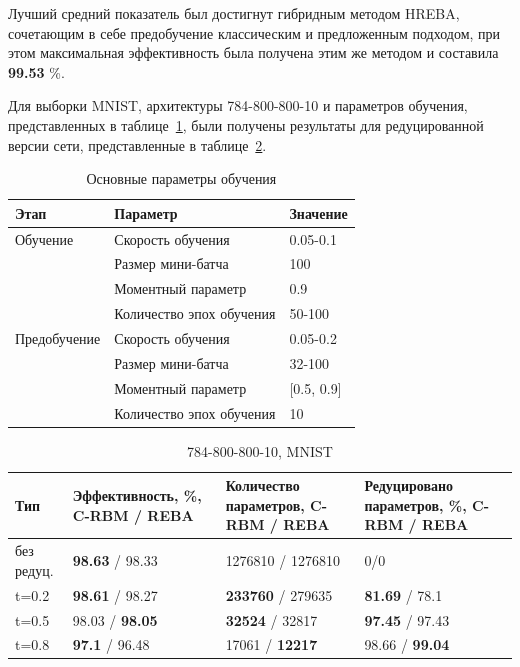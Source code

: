 \documentclass{thesisby}
\begin{document}
Лучший средний показатель был достигнут гибридным методом HREBA, сочетающим в себе предобучение классическим и предложенным подходом, при этом максимальная эффективность была получена этим же методом и составила \textbf{99.53} \%.

Для выборки MNIST, архитектуры 784-800-800-10 и параметров обучения, представленных в таблице~\ref{table:params_mnist_reduce}, были получены результаты для редуцированной версии сети, представленные в таблице~\ref{table:results_mnist_reduce}.

\begin{table} [h!]
  \small
  \caption{Основные параметры обучения}\label{table:params_mnist_reduce}
\centering
\begin{tabular}{| p{3cm} | p{6cm} | p{2cm} |}
  \hline
    \textbf{Этап} & \textbf{Параметр} & \textbf{Значение}\\
    \hline
    Обучение & Скорость обучения & 0.05-0.1\\
    \cline{2-3}
    & Размер мини-батча & 100 \\
    \cline{2-3}
    & Моментный параметр & 0.9 \\
    \cline{2-3}
    & Количество эпох обучения & 50-100\\
    \hline
    Предобучение & Скорость обучения & 0.05-0.2\\
    \cline{2-3}
    & Размер мини-батча & 32-100 \\
    \cline{2-3}
    & Моментный параметр & [0.5, 0.9] \\
    \cline{2-3}
    & Количество эпох обучения & 10\\
    \hline
\end{tabular}
\end{table}	
	
\begin{table} [h!]
  \small
  \caption{784-800-800-10, MNIST}\label{table:results_mnist_reduce}
\centering
\begin{tabular}{| p{2cm} | p{4cm} | p{4cm} | p{4cm} |}
  \hline
    \textbf{Тип} & \textbf{Эффективность, \%, C-RBM / REBA} & \textbf{Количество параметров, C-RBM / REBA} & \textbf{Редуцировано параметров, \%, C-RBM / REBA}\\
    \hline
    без редуц. & \textbf{98.63} / 98.33 & 1276810 / 1276810 & 0/0\\
    \hline
    t=0.2 & \textbf{98.61} / 98.27 & \textbf{233760} / 279635 & \textbf{81.69} / 78.1\\
    \hline
    t=0.5 & 98.03 / \textbf{98.05} & \textbf{32524} / 32817 & \textbf{97.45} / 97.43\\
    \hline
    t=0.8 & \textbf{97.1} / 96.48 & 17061 / \textbf{12217} & 98.66 / \textbf{99.04}\\
    \hline
\end{tabular}
\end{table}
\end{document}
